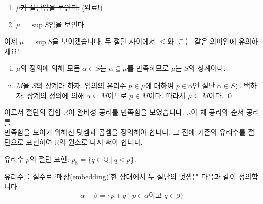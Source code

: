 \documentclass[serif]{beamer}
\begin{document}
\begin{frame}{}
    \begin{hint}[목표]
        \begin{enumerate}[(1)]
            \item \sout{$\mu$가 절단임을 보인다.} (완료!)
            \item $\mu=\sup S$임을 보인다.
        \end{enumerate}
    \end{hint}
    이제 $\mu=\sup S$을 보이겠습니다. 두 절단 사이에서 $\leq$와 $\subseteq$는 같은 의미임에 유의하세요!
    \begin{enumerate}[(i)]
        \item $\mu$의 정의에 의해 모든 $\alpha\in S$는 $\alpha\subseteq\mu$를 만족하므로 $\mu$는 $S$의 상계이다.
        \item $M$을 $S$의 상계라 하자. 임의의 유리수 $p\in\mu$에 대하여 $p\in\alpha$인 절단 $\alpha\in S$를 택하자.
            상계의 정의에 의해 $\alpha\subseteq M$이므로 $p\in M$이다. 따라서 $\mu\subseteq M$이다. \qed
    \end{enumerate}
    이로서 절단의 집합 $\mathbb R$이 완비성 공리를 만족함을 보였습니다.
    $\mathbb R$이 체 공리와 순서 공리를 \\ 만족함을 보이기 위해선 덧셈과 곱셈을 정의해야 합니다.
    그 전에 기존의 유리수를 절단으로 표현하여 $\mathbb R$의 원소로 다시 써야 합니다.
    \begin{center}
        유리수 $p$의 절단 표현: $p_{\mathbb R}=\{q\in\mathbb Q\mid q<p\}$.
    \end{center}
    유리수를 실수로 `매장(embedding)'한 상태에서 두 절단의 덧셈은 다음과 같이 정의합니다.
    \[
        \alpha+\beta=\{p+q\mid p\in\alpha\text{이고 }q\in\beta\}
    \]
\end{frame}
\end{document}

